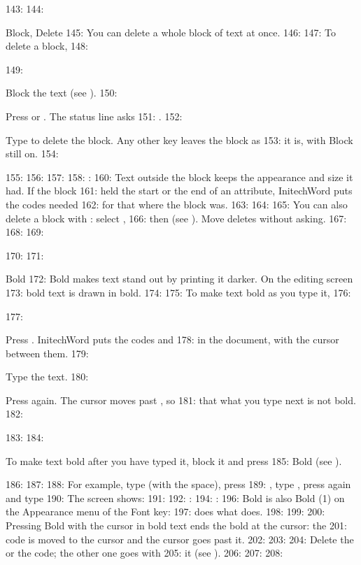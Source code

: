 143: 
144: \begin{Feature}{Block, Delete}
145: You can delete a whole block of text at once.
146: 
147: To delete a block,
148: \begin{WPSteps}
149: \item Block the text (see ).
150: \item Press  or .  The status line asks
151: .
152: \item Type  to delete the block.  Any other key leaves the block as
153: it is, with Block still on.
154: \end{WPSteps}
155: 
156: 
157: 
158: : 
160: Text outside the block keeps the appearance and size it had.  If the block
161: held the start or the end of an attribute, InitechWord puts the codes needed
162: for that where the block was.
163: 
164: 
165: You can also delete a block with : select ,
166: then  (see ).  Move deletes without asking.
167: 
168: 
169: \end{Feature}
170: 
171: \begin{Feature}{Bold}
172: Bold makes text stand out by printing it darker.  On the editing screen
173: bold text is drawn in bold.
174: 
175: To make text bold as you type it,
176: \begin{WPSteps}
177: \item Press .  InitechWord puts the codes \Code{[BOLD]} and
178: \Code{[bold]} in the document, with the cursor between them.
179: \item Type the text.
180: \item Press  again.  The cursor moves past \Code{[bold]}, so
181: that what you type next is not bold.
182: \end{WPSteps}
183: 
184: \begin{WPNote}To make text bold after you have typed it, block it and press
185: Bold (see ).\end{WPNote}
186: 
187: 
188: For example, type (with the space), press
189: , type , press  again and type
190:   The screen shows:
191: 
192: : 
194: : 
196: Bold is also Bold (1) on the Appearance menu of the Font key: 
197: does what  does.
198: 
199: 
200: Pressing Bold with the cursor in bold text ends the bold at the cursor: the
201: \Code{[bold]} code is moved to the cursor and the cursor goes past it.
202: 
203: 
204: Delete the \Code{[BOLD]} or the \Code{[bold]} code; the other one goes with
205: it (see ).
206: 
207: 
208: \end{Feature}
